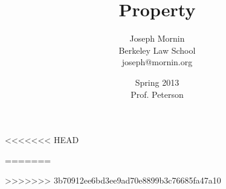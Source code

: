 \documentclass[letterpaper,titlepage]{article}
\begin{document}
\title{Property}
\author{Joseph Mornin\\Berkeley Law School\\joseph@mornin.org}
\date{Spring 2013\\Prof. Peterson}
\maketitle
\tableofcontents
\pagebreak






<<<<<<< HEAD

=======

>>>>>>> 3b70912ee6bd3ee9ad70e8899b3c76685fa47a10

\end{document}
